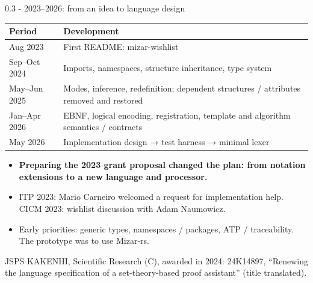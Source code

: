 \documentclass[aspectratio=169,11pt]{beamer}
\begin{document}
\begin{frame}[fragile,t]{0.3 - 2023–2026: from an idea to language design}
\par{}
\begin{footnotesize}
\setlength{\tabcolsep}{3pt}
\renewcommand{\arraystretch}{1.15}
\begin{tabularx}{\textwidth}{l>{\raggedright\arraybackslash}X}
\toprule
\textbf{Period} & \textbf{Development} \\
\midrule
Aug 2023 & First README: mizar-wishlist \\
Sep–Oct 2024 & Imports, namespaces, structure inheritance, type system \\
May–Jun 2025 & Modes, inference, redefinition; dependent structures / attributes removed and restored \\
Jan–Apr 2026 & EBNF, logical encoding, registration, template and algorithm semantics / contracts \\
May 2026 & Implementation design → test harness → minimal lexer \\
\bottomrule
\end{tabularx}
\end{footnotesize}

\begin{itemize}
\setlength{\itemsep}{1pt}
\setlength{\parsep}{0pt}
\setlength{\parskip}{0pt}
\item \textcolor{blue!55!black}{\textbf{Preparing the 2023 grant proposal changed the plan: from notation extensions to a new language and processor.}}
\item ITP 2023: Mario Carneiro welcomed a request for implementation help. CICM 2023: wishlist discussion with Adam Naumowicz.
\item Early priorities: generic types, namespaces / packages, ATP / traceability. The prototype was to use Mizar-rs.
\end{itemize}
{\footnotesize JSPS KAKENHI, Scientific Research (C), awarded in 2024: 24K14897, “Renewing the language specification of a set-theory-based proof assistant” (title translated).}


\end{frame}
\end{document}
